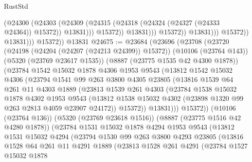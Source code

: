 \begin{lexlean}{RustStd}
\begin{coremodule}
                                    (@24300
                                      (@24303
                                        (@24309
                                          (@24315
                                            (@24318 (@24324 (@24327 (@24333 @24364)) @15372))
                                            @13831)))
                                      @15372))
                                  @13831)))
                            @15372))
                        @13831)))
                  @15372))
              @13831)))
        @15372))
    @13831
@24675 := @23684
    (@23696
      (@23708
        (@23720
          (@24198 (@24204 (@24207 (@24213 @24399)) @15372))
          (@10106 (@23764 @143))
          (@5320 (@23769 @23617 @1535))
          (@8887 (@23775 @1535 @42 @4300 @1878))
          (@23784
            @1542
            @15032
            @1878
            @4306
            @1953
            @9543
            (@13812
              @1542
              @15032
              @4306
              (@23794
                @1541
                @99
                @263
                @3800
                @4305
                @23805
                (@13816
                  @1539
                  @64
                  @261
                  @11
                  @4303
                  @1889
                  (@23813
                    @1539
                    @261
                    @4303
                    (@23784
                      @1538
                      @15032
                      @1878
                      @4302
                      @1953
                      @9543
                      (@13812 @1538 @15032 @4302 (@23898 @1320 @99 @263 @2813 @4059 @23907 @24172))
                      @15372))
                  @13831)))
            @15372))
        (@10106 (@23764 @136))
        (@5320 (@23769 @23618 @1516))
        (@8887 (@23775 @1516 @42 @4280 @1878))
        (@23784
          @1531
          @15032
          @1878
          @4294
          @1953
          @9543
          (@13812
            @1531
            @15032
            @4294
            (@23794
              @1530
              @99
              @263
              @3800
              @4293
              @23805
              (@13816
                @1528
                @64
                @261
                @11
                @4291
                @1889
                (@23813
                  @1528
                  @261
                  @4291
                  (@23784
                    @1527
                    @15032
                    @1878

\end{coremodule}
\end{lexlean}
